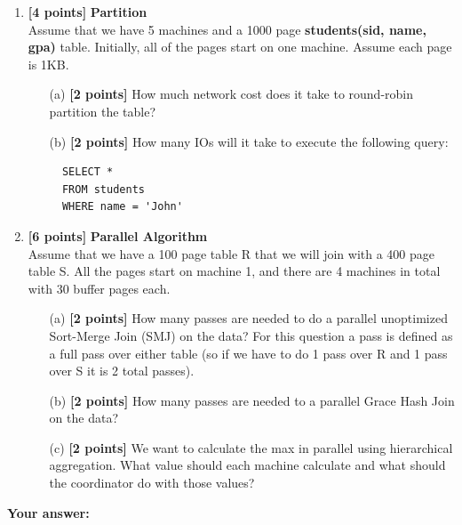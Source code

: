 \documentclass[10pt]{article}
\begin{document}
\begin{enumerate}

	\item \textbf{[4 points]} \textbf{Partition} \\
	      Assume that we have 5 machines and a 1000 page \textbf{students(sid, name, gpa)} table. Initially,
	      all of the pages start on one machine. Assume each page is 1KB.
	      \begin{itemize}
		      \item[(a)] \textbf{[2 points]} How much network cost does it take to round-robin partition the table? \\
		      \item[(b)] \textbf{[2 points]} How many IOs will it take to execute the following query:
		            \begin{lstlisting} 
  SELECT *
  FROM students
  WHERE name = 'John'
\end{lstlisting}
	      \end{itemize}


	\item \textbf{[6 points]} \textbf{Parallel Algorithm} \\
	      Assume that we have a 100 page table R that we will join with a 400 page table S.
	      All the pages start on machine 1, and there are 4 machines in total with 30 buffer pages each.
	      \begin{itemize}
		      \item[(a)] \textbf{[2 points]} How many passes are needed to do a parallel unoptimized Sort-Merge Join (SMJ) on the data? For
		            this question a pass is defined as a full pass over either table (so if we have to do 1 pass over R and 1 pass
		            over S it is 2 total passes). \\
		      \item[(b)] \textbf{[2 points]} How many passes are needed to a parallel Grace Hash Join on the data? \\
		      \item[(c)] \textbf{[2 points]} We want to calculate the max in parallel using hierarchical aggregation. What value should
		            each machine calculate and what should the coordinator do with those values? \\
	      \end{itemize}

\end{enumerate}
\textbf{Your answer:}
\end{document}
